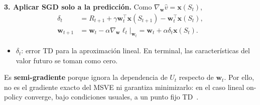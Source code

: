 \textbf{3. Aplicar SGD solo a la predicción.} Como $\nabla_{\mathbf{w}}\hat v=\mathbf{x}(S_t)$,
\begin{equation}\label{eq:semi-gradient-td}
\begin{aligned}
    \delta_t&=R_{t+1}+\gamma\mathbf{w}_t^{\top}\mathbf{x}(S_{t+1})
                         -\mathbf{w}_t^{\top}\mathbf{x}(S_t),\\
    \mathbf{w}_{t+1}&=\mathbf{w}_t-\alpha\nabla_{\mathbf{w}}\ell_t\big|_{\mathbf{w}_t}
                   =\mathbf{w}_t+\alpha\delta_t\mathbf{x}(S_t).
\end{aligned}
\end{equation}
\begin{itemize}
    \item $\delta_t$: error TD para la aproximación lineal. En terminal, las características del valor futuro se toman como cero.
\end{itemize}
Es \textbf{semi-gradiente} porque ignora la dependencia de $U_t$ respecto de $\mathbf{w}_t$. Por ello, no es el gradiente exacto del MSVE ni garantiza minimizarlo: en el caso lineal on-policy converge, bajo condiciones usuales, a un punto fijo TD~\cite[secc.~9.4]{sutton}.
